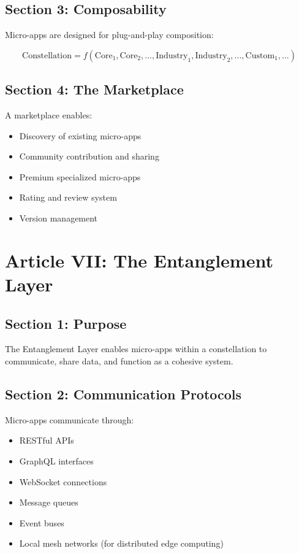 \documentclass[12pt,letterpaper]{article}
\begin{document}
\subsection{Section 3: Composability}

Micro-apps are designed for plug-and-play composition:

\begin{equation}
\text{Constellation} = f(\text{Core}_1, \text{Core}_2, ..., \text{Industry}_1, \text{Industry}_2, ..., \text{Custom}_1, ...)
\end{equation}

\subsection{Section 4: The Marketplace}

A marketplace enables:

\begin{itemize}
    \item Discovery of existing micro-apps
    \item Community contribution and sharing
    \item Premium specialized micro-apps
    \item Rating and review system
    \item Version management
\end{itemize}

\section{Article VII: The Entanglement Layer}

\subsection{Section 1: Purpose}

The Entanglement Layer enables micro-apps within a constellation to communicate, share data, and function as a cohesive system.

\subsection{Section 2: Communication Protocols}

Micro-apps communicate through:

\begin{itemize}
    \item RESTful APIs
    \item GraphQL interfaces
    \item WebSocket connections
    \item Message queues
    \item Event buses
    \item Local mesh networks (for distributed edge computing)
\end{itemize}
\end{document}
